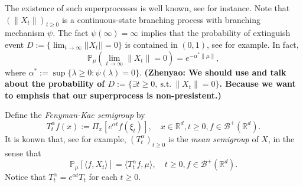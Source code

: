 \documentclass[12pt, a4paper]{amsart}
\theoremstyle{definition}
\numberwithin{equation}{section}
\begin{document}
    The existence of such superprocesses is well known, see \cite{EB} for instance.
    Note that $(\|X_t\|)_{t\geq 0}$ is a continuous-state branching process with branching mechanism $\psi$.
    The fact $\psi(\infty)=\infty$ implies that the probability of extinguish event $D:=\{\lim_{t \rightarrow \infty}||X_t||=0\}$ is contained in $(0,1)$, see \cite[Theorem 12.7]{Kyprianou2014Fluctuations} for example.
    In fact,
\begin{equation}
    \mathbb{P}_{\mu} (\lim_{t \to \infty}\|X_t\|=0 )
    = e^{-\alpha^* \|\mu\|},
\end{equation}
    where $\alpha^* := \sup\{\lambda \geq 0: \psi(\lambda) = 0\}$.
    {\bf (Zhenyao: We should use \cite[Theorem 12.5]{Kyprianou2014Fluctuations} and talk about the probability of $D:= \{\exists t\geq 0,~\text{s.t.}~\|X_t\|=0\}$. Because we want to emphsis that our superprocess is non-presistent.)}

    Define the \emph{Fenyman-Kac semigroup} by
\begin{equation}\label{meansemigroup}
    T^{\alpha}_t f(x)
    := \Pi_x [e^{\alpha t}f(\xi_t)],
    \quad x\in \mathbb{R}^d,t\geq 0, f\in \mathscr B^+(\mathbb R^d).
\end{equation}
    It is konwn that, see \cite[Proposition 2.27]{Li2011Measure-valued} for example, $(T^\alpha_t)_{t\geq 0}$ is the \emph{mean semigroup} of $X$, in the sense that
\begin{equation}\label{eq:meanformula}
    \mathbb{P}_{\mu}[\langle f, X_t \rangle]
    = \langle T_t^\alpha f, \mu \rangle,
    \quad t\geq 0, f\in \mathscr B^+(\mathbb R^d).
\end{equation}
Notice that $T^{\alpha}_t =e^{\alpha t}T_t$ for each $t \geq 0$.
\end{document}

